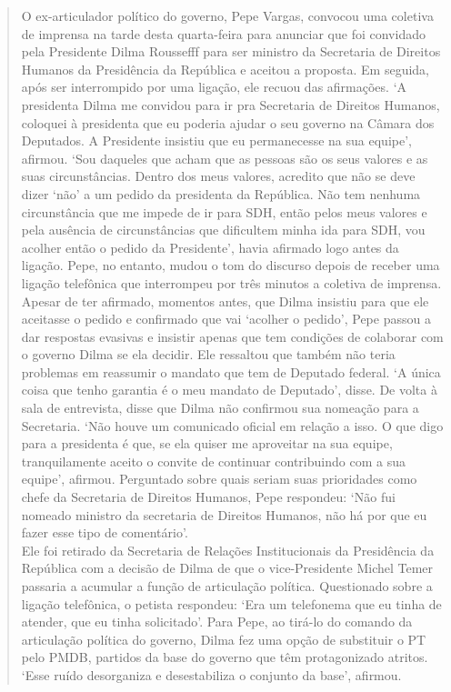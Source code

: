 \asterisc

\begin{quote}
O ex-articulador político do governo, Pepe Vargas, convocou uma
coletiva de imprensa na tarde desta quarta-feira para anunciar que foi
convidado pela Presidente Dilma Roussefff para ser ministro da
Secretaria de Direitos Humanos da Presidência da República e aceitou a
proposta. Em seguida, após ser interrompido por uma ligação, ele recuou
das afirmações. `A presidenta Dilma me convidou para ir pra Secretaria
de Direitos Humanos, coloquei à presidenta que eu poderia ajudar o seu
governo na Câmara dos Deputados. A Presidente insistiu que eu
permanecesse na sua equipe', afirmou. `Sou daqueles que acham que as
pessoas são os seus valores e as suas circunstâncias. Dentro dos meus
valores, acredito que não se deve dizer `não' a um pedido da presidenta
da República. Não tem nenhuma circunstância que me impede de ir para
SDH, então pelos meus valores e pela ausência de circunstâncias que
dificultem minha ida para SDH, vou acolher então o pedido da
Presidente', havia afirmado logo antes da ligação. Pepe, no entanto,
mudou o tom do discurso depois de receber uma ligação telefônica que
interrompeu por três minutos a coletiva de imprensa. Apesar de ter
afirmado, momentos antes, que Dilma insistiu para que ele aceitasse o
pedido e confirmado que vai `acolher o pedido', Pepe passou a dar
respostas evasivas e insistir apenas que tem condições de colaborar com
o governo Dilma se ela decidir. Ele ressaltou que também não teria
problemas em reassumir o mandato que tem de Deputado federal. `A única
coisa que tenho garantia é o meu mandato de Deputado', disse. De volta à
sala de entrevista, disse que Dilma não confirmou sua nomeação para a
Secretaria. `Não houve um comunicado oficial em relação a isso. O que
digo para a presidenta é que, se ela quiser me aproveitar na sua equipe,
tranquilamente aceito o convite de continuar contribuindo com a sua
equipe', afirmou. Perguntado sobre quais seriam suas prioridades como
chefe da Secretaria de Direitos Humanos, Pepe respondeu: `Não fui
nomeado ministro da secretaria de Direitos Humanos, não há por que eu
fazer esse tipo de comentário'.\\Ele foi retirado da Secretaria de
Relações Institucionais da Presidência da República com a decisão de
Dilma de que o vice-Presidente Michel Temer passaria a acumular a função
de articulação política. Questionado sobre a ligação telefônica, o
petista respondeu: `Era um telefonema que eu tinha de atender, que eu
tinha solicitado'. Para Pepe, ao tirá-lo do comando da articulação
política do governo, Dilma fez uma opção de substituir o PT pelo PMDB,
partidos da base do governo que têm protagonizado atritos. `Esse ruído
desorganiza e desestabiliza o conjunto da base', afirmou.
\end{quote} 

